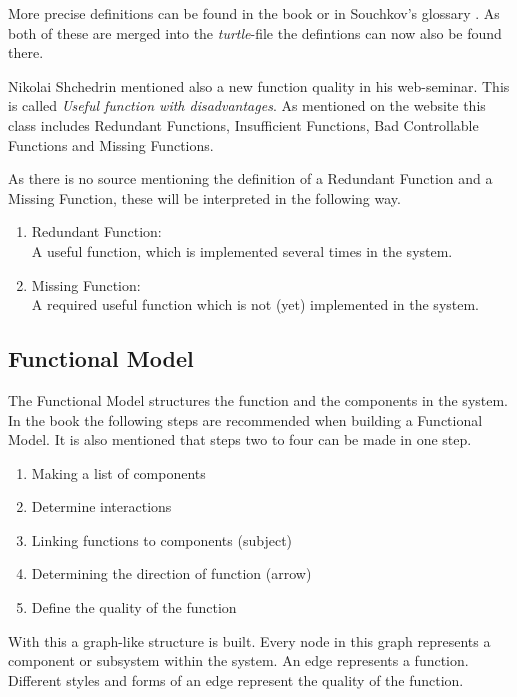 \documentclass[11pt,a4paper]{article}
\begin{document}
More precise definitions can be found in the book \cite{KS} or in Souchkov's
glossary \cite{SouchkovGlossary}.  As both of these are merged into the
\emph{turtle}-file the defintions can now also be found there.

Nikolai Shchedrin mentioned also a new function quality in his web-seminar.
This is called \emph{Useful function with disadvantages}.  As mentioned on the
website \cite{ShchedrinUsefulFunctionDisadvantage} this class includes
Redundant Functions, Insufficient Functions, Bad Controllable Functions and
Missing Functions.

As there is no source mentioning the definition of a Redundant Function and a
Missing Function, these will be interpreted in the following way.
\begin{enumerate}
\item Redundant Function: \\
  A useful function, which is implemented several times in the system.
\item Missing Function: \\
  A required useful function which is not (yet) implemented in the system.
\end{enumerate}

\subsection{Functional Model}
\label{subsec:functional_model}

The Functional Model structures the function and the components in the system.
In the book the following steps are recommended when building a Functional
Model.  It is also mentioned that steps two to four can be made in one step.
\begin{enumerate}
\item Making a list of components
\item Determine interactions
\item Linking functions to components (subject)
\item Determining the direction of function (arrow)
\item Define the quality of the function
\end{enumerate}

With this a graph-like structure is built.  Every node in this graph
represents a component or subsystem within the system.  An edge represents a
function.  Different styles and forms of an edge represent the quality of the
function.
\end{document}

